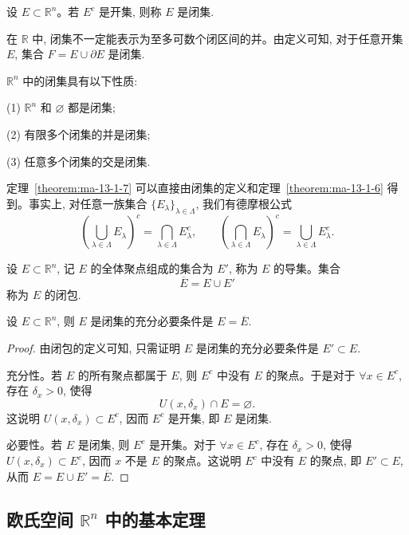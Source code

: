 \begin{definition}\label{definition:ma-13-1-7}
设 $E\subset\mathbb R^n$。若 $E^c$ 是开集, 则称 $E$ 是闭集.
\end{definition}

在 $\mathbb R$ 中, 闭集不一定能表示为至多可数个闭区间的并。由定义可知, 对于任意开集 $E$, 集合 $F=E\cup\partial E$ 是闭集.

\begin{theorem}\label{theorem:ma-13-1-7}
$\mathbb R^n$ 中的闭集具有以下性质:

(1) $\mathbb R^n$ 和 $\varnothing$ 都是闭集;

(2) 有限多个闭集的并是闭集;

(3) 任意多个闭集的交是闭集.
\end{theorem}

定理~\ref{theorem:ma-13-1-7} 可以直接由闭集的定义和定理~\ref{theorem:ma-13-1-6} 得到。事实上, 对任意一族集合 $\{E_\lambda\}_{\lambda\in\Lambda}$, 我们有德摩根公式
\[
  \left(\bigcup_{\lambda\in\Lambda}E_\lambda\right)^c
  =\bigcap_{\lambda\in\Lambda}E_\lambda^c,\qquad
  \left(\bigcap_{\lambda\in\Lambda}E_\lambda\right)^c
  =\bigcup_{\lambda\in\Lambda}E_\lambda^c.
\]

设 $E\subset\mathbb R^n$, 记 $E$ 的全体聚点组成的集合为 $E'$, 称为 $E$ 的导集。集合
\[
  \overline E=E\cup E'
\]
称为 $E$ 的闭包.

\begin{theorem}\label{theorem:ma-13-1-8}
设 $E\subset\mathbb R^n$, 则 $E$ 是闭集的充分必要条件是 $E=\overline E$.
\end{theorem}


\begin{proof}
由闭包的定义可知, 只需证明 $E$ 是闭集的充分必要条件是 $E'\subset E$.

充分性。若 $E$ 的所有聚点都属于 $E$, 则 $E^c$ 中没有 $E$ 的聚点。于是对于 $\forall x\in E^c$, 存在 $\delta_x>0$, 使得
\[
  U(x,\delta_x)\cap E=\varnothing.
\]
这说明 $U(x,\delta_x)\subset E^c$, 因而 $E^c$ 是开集, 即 $E$ 是闭集.

必要性。若 $E$ 是闭集, 则 $E^c$ 是开集。对于 $\forall x\in E^c$, 存在 $\delta_x>0$, 使得 $U(x,\delta_x)\subset E^c$, 因而 $x$ 不是 $E$ 的聚点。这说明 $E^c$ 中没有 $E$ 的聚点, 即 $E'\subset E$, 从而 $E=E\cup E'=\overline E$.
\end{proof}


\subsection{\texorpdfstring{欧氏空间 $\mathbb R^n$ 中的基本定理}{欧氏空间 Rⁿ 中的基本定理}}
\label{subsec:ma-13-1-5}

